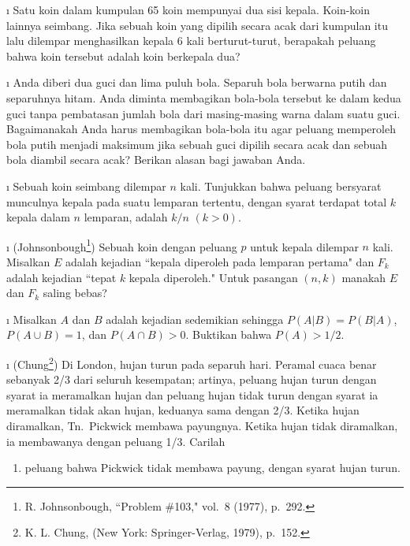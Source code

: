 \begin{LJSItem}
\i\label{exer 4.1.20} Satu koin dalam kumpulan 65 koin mempunyai dua sisi kepala.  Koin-koin lainnya seimbang.  Jika sebuah
koin yang dipilih secara acak dari kumpulan itu lalu dilempar menghasilkan kepala 6 kali
berturut-turut, berapakah peluang bahwa koin tersebut adalah koin berkepala dua?

\i\label{exer 4.1.21} Anda diberi dua guci dan lima puluh bola.  Separuh bola berwarna putih dan
separuhnya hitam.  Anda diminta membagikan bola-bola tersebut ke dalam kedua guci tanpa
pembatasan jumlah bola dari masing-masing warna dalam suatu guci.  Bagaimanakah Anda harus
membagikan bola-bola itu agar peluang memperoleh bola
putih menjadi maksimum jika sebuah guci dipilih secara acak dan sebuah bola diambil secara acak? 
Berikan alasan bagi jawaban Anda.

\i\label{exer 4.1.22} Sebuah koin seimbang dilempar $n$ kali.  Tunjukkan bahwa peluang bersyarat
munculnya kepala pada suatu lemparan tertentu, dengan syarat terdapat total $k$ kepala dalam $n$
lemparan, adalah $k/n$ $(k > 0)$.

\i\label{exer 4.1.23} (Johnsonbough\footnote{R. Johnsonbough, ``Problem
\#103,"  vol.~8 (1977), p.~292.})  Sebuah koin dengan peluang
$p$ untuk kepala dilempar $n$ kali.  Misalkan $E$ adalah kejadian ``kepala diperoleh pada
lemparan pertama" dan $F_k$ adalah kejadian ``tepat $k$ kepala diperoleh."  Untuk pasangan
$(n,k)$ manakah $E$ dan $F_k$ saling bebas?

\i\label{exer 4.1.24} Misalkan $A$ dan $B$ adalah kejadian sedemikian sehingga $P(A|B) = P(B|A)$, $P(A
\cup B) = 1$, dan $P(A \cap B) > 0$.  Buktikan bahwa $P(A) > 1/2$.

\i\label{exer 4.1.25} (Chung\footnote{K. L. Chung,  (New York:  Springer-Verlag, 1979), p.~152.})
Di London, hujan turun pada separuh hari.  Peramal cuaca benar sebanyak 2/3 dari seluruh kesempatan;
artinya, peluang hujan turun dengan syarat ia meramalkan hujan dan peluang hujan
tidak turun dengan syarat ia meramalkan tidak akan hujan, keduanya sama dengan 2/3.  Ketika hujan
diramalkan, Tn.\ Pickwick membawa payungnya.  Ketika hujan tidak diramalkan, ia
membawanya dengan peluang 1/3.  Carilah
\begin{enumerate}
\item peluang bahwa Pickwick tidak membawa payung, dengan syarat hujan turun.


\end{enumerate}
\end{LJSItem}
